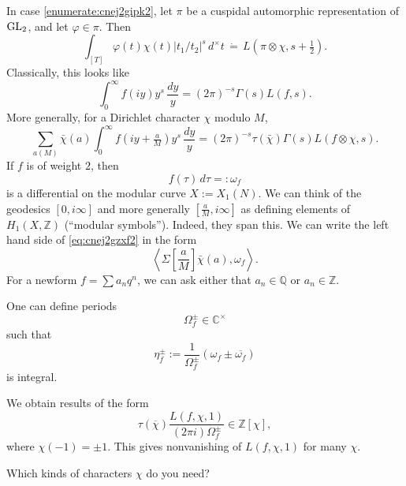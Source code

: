 \documentclass[reqno]{amsart} 
\begin{document}
In case \eqref{enumerate:cnej2gipk2}, let $\pi$ be a cuspidal automorphic representation of $\operatorname{GL}_2$, and let $\varphi \in \pi$.  Then
\begin{equation*}
  \int_{[T]} \varphi(t) \chi(t) \lvert t_1 / t_2 \rvert^s \, d^\times t
  \, \dot{=}\,
  L(\pi \otimes \chi, s + \tfrac{1}{2}).
\end{equation*}
Classically, this looks like
\begin{equation*}
  \int_0^\infty f(i y ) y^s \, \frac{d y}{y}
  =(2 \pi )^{- s} \Gamma(s) L(f, s).
\end{equation*}
More generally, for a Dirichlet character $\chi$ modulo $M$,
\begin{equation}\label{eq:cnej2gzxf2}
  \sum_{a (M)} \bar{\chi}(a) \int_0^\infty f(i y + \tfrac{a}{M} ) y^s \, \frac{d y}{y}
  =(2 \pi )^{- s} \tau(\bar{\chi})\Gamma(s) L(f \otimes \chi, s).
\end{equation}
If $f$ is of weight $2$, then
\begin{equation*}
  f(\tau) \, d \tau =: \omega_f 
\end{equation*}
is a differential on the modular curve $X := X_1(N)$.  We can think of the geodesics $[0,i \infty]$ and more generally $[ \tfrac{a}{M}, i \infty ]$ as defining elements of $H_1(X, \mathbb{Z})$ (``modular symbols'').  Indeed, they span this.  We can write the left hand side of \eqref{eq:cnej2gzxf2} in the form
\begin{equation*}
  \left\langle \Sigma \left[ \frac{a}{M} \right]  \bar{\chi}(a), \omega_f \right\rangle.
\end{equation*}
For a newform $f= \sum a_n q^n$, we can ask either that $a_n \in \mathbb{Q}$ or $a_n \in \mathbb{Z}$.

One can define periods
\begin{equation*}
  \Omega_f^{\pm} \in \mathbb{C}^\times
\end{equation*}
such that
\begin{equation*}
  \eta_f^{\pm} := \frac{1}{ \Omega_f^{\pm} } \left( \omega_f \pm \overline{\omega_f} \right)
\end{equation*}
is integral.

We obtain results of the form
\begin{equation*}
  \tau(\overline{\chi})
  \frac{L(f, \chi, 1)}{(2 \pi i) \Omega_f^{\pm}}  \in \mathbb{Z} [\chi],
\end{equation*}
where $\chi(-1) = \pm 1$.  This gives nonvanishing of $L(f, \chi, 1)$ for many $\chi$.
\begin{question}
  Which kinds of characters $\chi$ do you need?
\end{question}
\end{document}
